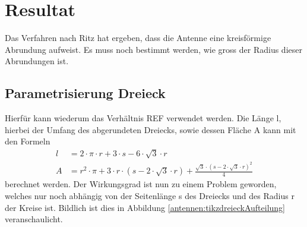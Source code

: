 %
%
% 
%
%

\section{Resultat\label{antennen:resultat}}

Das Verfahren nach Ritz hat ergeben, dass die Antenne eine kreisförmige Abrundung aufweist. 
Es muss noch bestimmt werden, wie gross der Radius dieser Abrundungen ist. 

\subsection{Parametrisierung Dreieck\label{antennen:param3eck}}
Hierfür kann wiederum das Verhältnis REF verwendet werden. Die Länge l, hierbei der Umfang 
des abgerundeten Dreiecks, sowie dessen Fläche A kann mit den Formeln
\begin{align}
	l &= 2 \cdot \pi \cdot r + 3 \cdot s - 6 \cdot \sqrt{3} \cdot r \tag{20.24} \label{antennen:Länge} \\
	A &= r^2 \cdot \pi + 3 \cdot r \cdot (s - 2 \cdot \sqrt{3} \cdot r) + \frac{\sqrt{3} \cdot (s - 2 \cdot \sqrt{3} \cdot r)^2}{4} \tag{20.25} \label{antennen:Fläche}
\end{align}
\setcounter{equation}{25}
berechnet werden.
Der Wirkungsgrad ist nun zu einem Problem geworden, welches nur noch abhängig von 
der Seitenlänge s des Dreiecks und des Radius r der Kreise ist. Bildlich ist dies 
in Abbildung \ref{antennen:tikzdreieckAufteilung} veranschaulicht.

